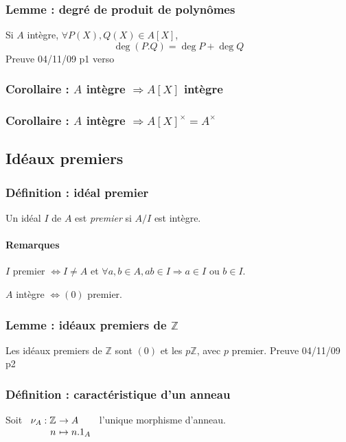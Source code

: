 \documentclass[reqno,a4paper,10pt]{report}
\makeatletter
\newcommand{\IZ}{\ensuremath{\mathbb{Z}}\xspace} %
\newcommand{\so}{\Rightarrow}
\newcommand{\soo}{\Longrightarrow}
\let\olditemize=\itemize%
\renewenvironment{itemize}{%
    \olditemize%
  }{%
    \@noparlisttrue%
    \endlist%
  }%
\makeatother
\begin{document}
\subsubsection{Lemme : degré de produit de polynômes}
Si $A$ intègre, $\forall P(X), Q(X) \in A[X]$,
\[\deg(P.Q) = \deg P + \deg Q\]
  Preuve 04/11/09 p1 verso

\subsubsection{Corollaire : $A$ intègre $\soo A[X]$ intègre}

\subsubsection{Corollaire : $A$ intègre $\soo A[X]^\times = A^\times$}

\subsection{Idéaux premiers}
\subsubsection{Définition : idéal premier}
Un idéal $I$ de $A$ est \emph{premier} si $A/I$ est intègre.

\paragraph{Remarques}
\begin{itemize}
  \item $I$ premier $\iff I \neq A$ et $\forall a,b \in A, ab\in I \so a
    \in I$ ou $b \in I$.
  \item $A$ intègre $\iff (0)$ premier.
\end{itemize}

\subsubsection{Lemme : idéaux premiers de $\IZ$}
Les idéaux premiers de $\IZ$ sont $(0)$ et les $p\IZ$, avec $p$ premier.
  Preuve 04/11/09 p2

\subsubsection{Définition : caractéristique d'un anneau}
Soit $\begin{array}[t]{r@{\ }l}
  \nu_A : \IZ &\to A\\
  n &\mapsto n.1_A
\end{array}$ l'unique morphisme d'anneau.
\end{document}
